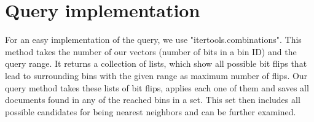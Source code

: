 \documentclass[12pt]{scrreprt}
\begin{document}
\section{Query implementation}
For an easy implementation of the query, we use "itertools.combinations". This method takes the number of our vectors (number of bits in a bin ID) and the query range. It returns a collection of lists, which show all possible bit flips that lead to surrounding bins with the given range as maximum number of flips. Our query method takes these lists of bit flips, applies each one of them and saves all documents found in any of the reached bins in a set. This set then includes all possible candidates for being nearest neighbors and can be further examined.\\
\end{document}

